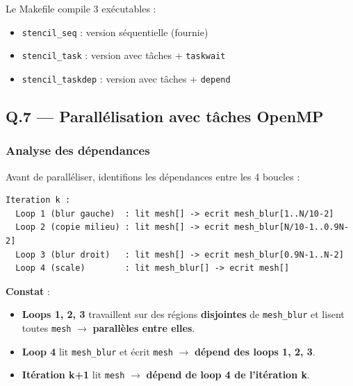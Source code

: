 \documentclass[12pt,a4paper]{article}
\begin{document}
Le Makefile compile 3 exécutables :
\begin{itemize}
  \item \texttt{stencil\_seq} : version séquentielle (fournie)
  \item \texttt{stencil\_task} : version avec tâches + \texttt{taskwait}
  \item \texttt{stencil\_taskdep} : version avec tâches + \texttt{depend}
\end{itemize}

\subsection{Q.7 --- Parallélisation avec tâches OpenMP}

\subsubsection{Analyse des dépendances}

Avant de paralléliser, identifions les dépendances entre les 4 boucles :

\begin{lstlisting}[style=bashstyle, caption={Dépendances entre boucles}]
Iteration k :
  Loop 1 (blur gauche)  : lit mesh[] -> ecrit mesh_blur[1..N/10-2]
  Loop 2 (copie milieu) : lit mesh[] -> ecrit mesh_blur[N/10-1..0.9N-2]
  Loop 3 (blur droit)   : lit mesh[] -> ecrit mesh_blur[0.9N-1..N-2]
  Loop 4 (scale)        : lit mesh_blur[] -> ecrit mesh[]
\end{lstlisting}

\textbf{Constat} :
\begin{itemize}
  \item \textbf{Loops 1, 2, 3} travaillent sur des régions \textbf{disjointes}
    de \texttt{mesh\_blur} et lisent toutes \texttt{mesh} $\rightarrow$
    \textbf{parallèles entre elles}.
  \item \textbf{Loop 4} lit \texttt{mesh\_blur} et écrit \texttt{mesh}
    $\rightarrow$ \textbf{dépend des loops 1, 2, 3}.
  \item \textbf{Itération k+1} lit \texttt{mesh} $\rightarrow$ \textbf{dépend
    de loop 4 de l'itération k}.
\end{itemize}
\end{document}
